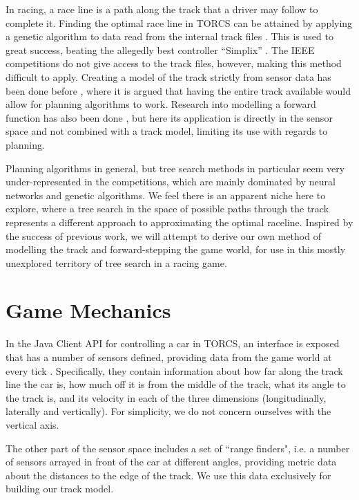 \documentclass[conference]{IEEEtran}
\begin{document}
In racing, a race line \cite{raceline} is a path along the track that a driver may follow to complete it. Finding the optimal race line in TORCS can be attained by applying a genetic algorithm to data read from the internal track files \cite{optimalraceline}. This is used to great success, beating the allegedly best controller ``Simplix'' \cite{simplix}. The IEEE competitions do not give access to the track files, however, making this method difficult to apply. Creating a model of the track strictly from sensor data has been done before \cite{trackmodel}, where it is argued that having the entire track available would allow for planning algorithms to work. Research into modelling a forward function has also been done \cite{cobostar}, but here its application is directly in the sensor space and not combined with a track model, limiting its use with regards to planning.

Planning algorithms in general, but tree search methods in particular seem very under-represented in the competitions, which are mainly dominated by neural networks and genetic algorithms. We feel there is an apparent niche here to explore, where a tree search in the space of possible paths through the track represents a different approach to approximating the optimal raceline. Inspired by the success of previous work, we will attempt to derive our own method of modelling the track and forward-stepping the game world, for use in this mostly unexplored territory of tree search in a racing game.

\section{Game Mechanics}
\label{sec-mechanics}
In the Java Client API for controlling a car in TORCS, an interface is exposed that has a number of sensors defined, providing data from the game world at every tick \cite{manual}. Specifically, they contain information about how far along the track line the car is, how much off it is from the middle of the track, what its angle to the track is, and its velocity in each of the three dimensions (longitudinally, laterally and vertically). For simplicity, we do not concern ourselves with the vertical axis.

The other part of the sensor space includes a set of ``range finders", i.e. a number of sensors arrayed in front of the car at different angles, providing metric data about the distances to the edge of the track. We use this data exclusively for building our track model.
\end{document}
